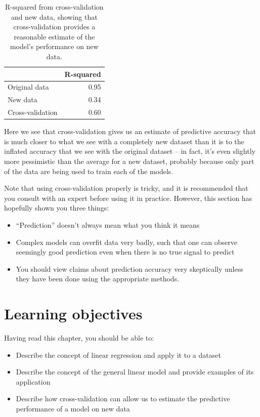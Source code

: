 \documentclass[
  12pt,
]{book}
\providecommand{\tightlist}{%
  \setlength{\itemsep}{0pt}\setlength{\parskip}{0pt}}
\begin{document}
\begin{table}

\caption{\label{tab:unnamed-chunk-87}R-squared from cross-validation and new data, showing that cross-validation provides a reasonable estimate of the model's performance on new data.}
\centering
\begin{tabular}[t]{l|r}
\hline
  & R-squared\\
\hline
Original data & 0.95\\
\hline
New data & 0.34\\
\hline
Cross-validation & 0.60\\
\hline
\end{tabular}
\end{table}

Here we see that cross-validation gives us an estimate of predictive accuracy that is much closer to what we see with a completely new dataset than it is to the inflated accuracy that we see with the original dataset -- in fact, it's even slightly more pessimistic than the average for a new dataset, probably because only part of the data are being used to train each of the models.

Note that using cross-validation properly is tricky, and it is recommended that you consult with an expert before using it in practice. However, this section has hopefully shown you three things:

\begin{itemize}
\tightlist
\item
  ``Prediction'' doesn't always mean what you think it means
\item
  Complex models can overfit data very badly, such that one can observe seemingly good prediction even when there is no true signal to predict
\item
  You should view claims about prediction accuracy very skeptically unless they have been done using the appropriate methods.
\end{itemize}

\hypertarget{learning-objectives-13}{%
\section{Learning objectives}\label{learning-objectives-13}}

Having read this chapter, you should be able to:

\begin{itemize}
\tightlist
\item
  Describe the concept of linear regression and apply it to a dataset
\item
  Describe the concept of the general linear model and provide examples of its application
\item
  Describe how cross-validation can allow us to estimate the predictive performance of a model on new data
\end{itemize}
\end{document}
